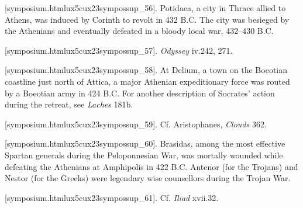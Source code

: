 [symposium.htmlux5cux23sympossup_56]. Potidaea, a city in
Thrace allied to Athens, was induced by Corinth to revolt in 432 B.C.
The city was besieged by the Athenians and eventually defeated in a
bloody local war, 432--430 B.C.

[symposium.htmlux5cux23sympossup_57]. {\em Odyssey} iv.242,
271.

[symposium.htmlux5cux23sympossup_58]. At Delium, a town on the
Boeotian coastline just north of Attica, a major Athenian expeditionary
force was routed by a Boeotian army in 424 B.C. For another description
of Socrates' action during the retreat, see {\em Laches} 181b.

[symposium.htmlux5cux23sympossup_59]. Cf. Aristophanes,
{\em Clouds} 362.

[symposium.htmlux5cux23sympossup_60]. Brasidas, among the most
effective Spartan generals during the Peloponnesian War, was mortally
wounded while defeating the Athenians at Amphipolis in 422 B.C. Antenor
(for the Trojans) and Nestor (for the Greeks) were legendary wise
counsellors during the Trojan War.

[symposium.htmlux5cux23sympossup_61]. Cf. {\em Iliad} xvii.32.


